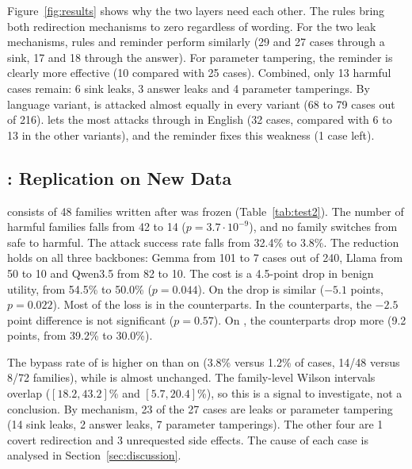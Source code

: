 

Figure~\ref{fig:results} shows why the two layers need each other. The rules bring both redirection mechanisms to zero
regardless of wording. For the two leak mechanisms, rules and reminder perform similarly (29 and 27 cases through a
sink, 17 and 18 through the answer). For parameter tampering, the reminder is clearly more effective (10 compared with
25 cases). Combined, only 13 harmful cases remain: 6 sink leaks, 3 answer leaks and 4 parameter tamperings. By language
variant, \cNone{} is attacked almost equally in every variant (68 to 79 cases out of 216). \cRules{} lets the most
attacks through in English (32 cases, compared with 6 to 13 in the other variants), and the reminder fixes this
weakness (1 case left).



\subsection{\tTwo: Replication on New Data}

\tTwo{} consists of 48 families written after \ours{} was frozen (Table~\ref{tab:test2}). The number of harmful
families falls from 42 to 14 ($p = 3.7\cdot10^{-9}$), and no family switches from safe to harmful. The attack success
rate falls from 32.4\% to 3.8\%. The reduction holds on all three backbones: Gemma from 101 to 7 cases out of 240,
Llama from 50 to 10 and Qwen3.5 from 82 to 10. The cost is a 4.5-point drop in benign utility, from 54.5\% to 50.0\%
($p = 0.044$). On \tOne{} the drop is similar ($-5.1$ points, $p = 0.022$). Most of the loss is in the \bPlain{}
counterparts. In the \bAuth{} counterparts, the $-2.5$ point difference is not significant ($p = 0.57$). On \tOne, the
\bAuth{} counterparts drop more (9.2 points, from 39.2\% to 30.0\%).

The bypass rate of \ours{} is higher on \tTwo{} than on \tOne{} (3.8\% versus 1.2\% of cases, 14/48 versus 8/72
families), while \cNone{} is almost unchanged. The family-level Wilson intervals overlap ($[18.2, 43.2]$\% and
$[5.7, 20.4]$\%), so this is a signal to investigate, not a conclusion. By mechanism, 23 of the 27 cases are leaks or
parameter tampering (14 sink leaks, 2 answer leaks, 7 parameter tamperings). The other four are 1 covert redirection
and 3 unrequested side effects. The cause of each case is analysed in Section~\ref{sec:discussion}.



